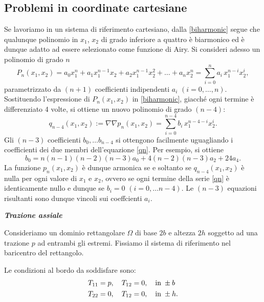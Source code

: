 \subsection{Problemi in coordinate cartesiane}
Se lavoriamo in un sistema di riferimento cartesiano,  dalla \eqref{biharmonic} segue che qualunque polinomio in $x_1$, $x_2$ di grado inferiore a quattro è biarmonico ed è dunque adatto ad essere selezionato come funzione di Airy.  Si consideri adesso un polinomio di grado $n$
\begin{equation}
	P_n(x_1,x_2)=a_0x_1^n+a_1 x_1^{n-1}x_2+a_2x_1^{n-1}x_2^2+\ldots+a_nx_2^n=\sum_{i=0}^na_i\,x_1^{n-i}x_2^i,
\end{equation}
parametrizzato da $(n+1)$ coefficienti indipendenti $a_i$ $(i=0,\ldots,n)$. Sostituendo l'espressione di $P_n(x_1,x_2)$ in \eqref{biharmonic}, giacché ogni termine è differenziato 4 volte, si ottiene un nuovo polinomio di grado $(n-4)$:
\begin{equation}\label{qn}
	q_{n-4}(x_1,x_2):=\nabla\nabla p_n(x_1,x_2)=\sum_{i=0}^{n-4}b_i\,x_1^{n-4-i}x_2^i.
\end{equation}
Gli $(n-3)$ coefficienti $b_0,\ldots b_{n-4}$ si ottengono facilmente uguagliando i coefficienti dei due membri dell'equazione \eqref{qn}. Per esempio, si ottiene 
\begin{equation}
	b_0=n(n-1)(n-2)(n-3)a_0+4(n-2)(n-3)a_2+24a_4.
\end{equation}
La funzione $p_n(x_1,x_2)$ è dunque armonica se e soltanto se $q_{n-4}(x_1,x_2)$ è nulla per ogni valore di $x_1$ e $x_2$, ovvero se ogni termine della serie \eqref{qn} è identicamente nullo e dunque se $b_i=0$ $(i=0,\ldots n-4)$. Le $(n-3)$ equazioni risultanti sono dunque vincoli sui coeffcienti $a_i$.


\vspace{.5cm}

\noindent\textsf{\small\textit{\textbf{Trazione assiale}}}


Consideriamo un dominio rettangolare $\Omega$ di base $2b$ e altezza $2h$ soggetto ad una trazione $p$ ad entrambi gli estremi. Fissiamo il sistema di riferimento nel baricentro del rettangolo. 

Le condizioni al bordo da soddisfare sono:
\begin{equation}\label{uniaxialbc}
	\begin{aligned}
		&T_{11}=p, \quad T_{12}=0, \quad {\rm in}\; \pm b \\
		&T_{22}=0, \quad T_{12}=0, \quad {\rm in}\; \pm h.
	\end{aligned}
\end{equation}

